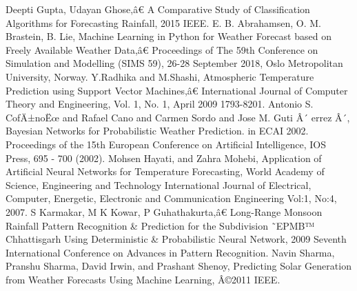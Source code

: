 \documentclass[conference]{IEEEtran}
\begin{document}
\begin{thebibliography}{00}
 Deepti Gupta, Udayan Ghose,â€ A Comparative Study of Classification Algorithms for Forecasting Rainfall, 2015 IEEE.
 E. B. Abrahamsen, O. M. Brastein, B. Lie, Machine Learning in Python for Weather Forecast based on Freely Available Weather Data,â€ Proceedings of The 59th Conference on Simulation and Modelling (SIMS 59), 26-28 September 2018, Oslo Metropolitan University, Norway.
 Y.Radhika and M.Shashi, Atmospheric Temperature Prediction using Support Vector Machines,â€ International Journal of Computer Theory and Engineering, Vol. 1, No. 1, April 2009 1793-8201.
 Antonio S. CofÄ±noËœ and Rafael Cano and Carmen Sordo and Jose M. Guti Â´ errez Â´, Bayesian Networks for Probabilistic Weather Prediction. in ECAI 2002. Proceedings of the 15th European Conference on Artificial Intelligence, IOS Press, 695 - 700 (2002).
 Mohsen Hayati, and Zahra Mohebi, Application of Artificial Neural Networks for Temperature Forecasting, World Academy of Science, Engineering and Technology International Journal of Electrical, Computer, Energetic, Electronic and Communication Engineering Vol:1, No:4, 2007.
 S Karmakar, M K Kowar, P Guhathakurta,â€ Long-Range Monsoon Rainfall Pattern Recognition \& Prediction for the Subdivision ˜EPMB™ Chhattisgarh Using Deterministic \& Probabilistic Neural Network, 2009 Seventh International Conference on Advances in Pattern Recognition.
 Navin Sharma, Pranshu Sharma, David Irwin, and Prashant Shenoy, Predicting Solar Generation from Weather Forecasts Using Machine Learning, Â©2011 IEEE.
\end{thebibliography}
\vspace{12pt}
\color{red}
\end{document}
